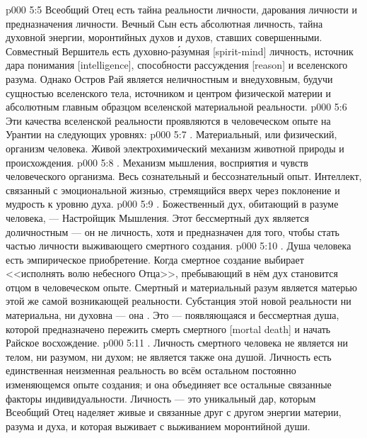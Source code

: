 \vs p000 5:5 \pc Всеобщий Отец есть тайна реальности личности, дарования личности и предназначения личности. Вечный Сын есть абсолютная личность, тайна духовной энергии, моронтийных духов и духов, ставших совершенными. Совместный Вершитель есть духовно\hyp{}р\'азумная [spirit\hyp{}mind] личность, источник дара понимания [intelligence], способности рассуждения [reason] и вселенского разума. Однако Остров Рай является неличностным и внедуховным, будучи сущностью вселенского тела, источником и центром физической материи и абсолютным главным образцом вселенской материальной реальности.
\vs p000 5:6 \pc Эти качества вселенской реальности проявляются в человеческом опыте на Урантии на следующих уровнях:
\vs p000 5:7 \bibnobreakspace {}. Материальный, или физический, организм человека. Живой электрохимический механизм животной природы и происхождения.
\vs p000 5:8 \bibnobreakspace {}. Механизм мышления, восприятия и чувств человеческого организма. Весь сознательный и бессознательный опыт. Интеллект, связанный с эмоциональной жизнью, стремящийся вверх через поклонение и мудрость к уровню духа.
\vs p000 5:9 \bibnobreakspace {}. Божественный дух, обитающий в разуме человека, --- Настройщик Мышления. Этот бессмертный дух является доличностным --- он не личность, хотя и предназначен для того, чтобы стать частью личности выживающего смертного создания.
\vs p000 5:10 \bibnobreakspace {}. Душа человека есть эмпирическое приобретение. Когда смертное создание выбирает <<исполнять волю небесного Отца>>, пребывающий в нём дух становится отцом  в человеческом опыте. Смертный и материальный разум является матерью этой же самой возникающей реальности. Субстанция этой новой реальности ни материальна, ни духовна --- она . Это --- появляющаяся и бессмертная душа, которой предназначено пережить смерть смертного [mortal death] и начать Райское восхождение.
\vs p000 5:11 \pc {}. Личность смертного человека не является ни телом, ни разумом, ни духом; не является также она душой. Личность есть единственная неизменная реальность во всём остальном постоянно изменяющемся опыте создания; и она объединяет все остальные связанные факторы индивидуальности. Личность --- это уникальный дар, которым Всеобщий Отец наделяет живые и связанные друг с другом энергии материи, разума и духа, и которая выживает с выживанием моронтийной души.
